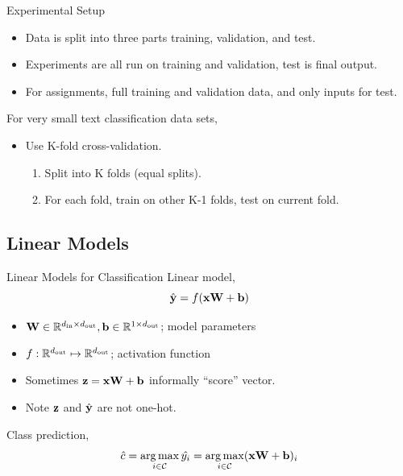\documentclass{beamer}
\begin{document}
\begin{frame}{Experimental Setup}
  
  \begin{itemize}
  \item Data is split into three parts training, validation, and test.
  \item Experiments are all run on training and validation, test is final output.

  \item For assignments, full training and validation data, and only inputs for test.
  \end{itemize}
  
  For very small text classification data sets,
  \begin{itemize}
  \item Use K-fold cross-validation. 
    \begin{enumerate}
    \item Split into K folds (equal splits).
    \item For each fold, train on other K-1 folds, test on current fold. 
    \end{enumerate}
  \end{itemize}
\end{frame}

\subsection{Linear Models}

\begin{frame}{Linear Models for Classification}
  Linear model,
  \[\hat{\mathbf{y}} = f(\mathbf{x} \mathbf{W} + \mathbf{b})\]    
  \begin{itemize}
  \item $\mathbf{W} \in \mathbb{R}^{{d_{\mathrm{in}}} \times {d_{\mathrm{out}}}}, \mathbf{b} \in \mathbb{R}^{1 \times {d_{\mathrm{out}}}}$; model parameters
  \item $f: \mathbb{R}^{{d_{\mathrm{out}}}} \mapsto \mathbb{R}^{{d_{\mathrm{out}}}}$; activation function 
  \item Sometimes $\mathbf{z} = \mathbf{x} \mathbf{W} + \mathbf{b}$ informally ``score'' vector. 
  \item Note $\mathbf{z}$ and $\hat{\mathbf{y}}$ are not one-hot.
  \end{itemize}

  \air 

  Class prediction,
  \[ \hat{c} = \argmax_{i \in \mcC} \hat{y_i}  = \argmax_{i \in \mcC} (\boldx \boldW + \boldb)_i    \]
\end{frame}
\end{document}
